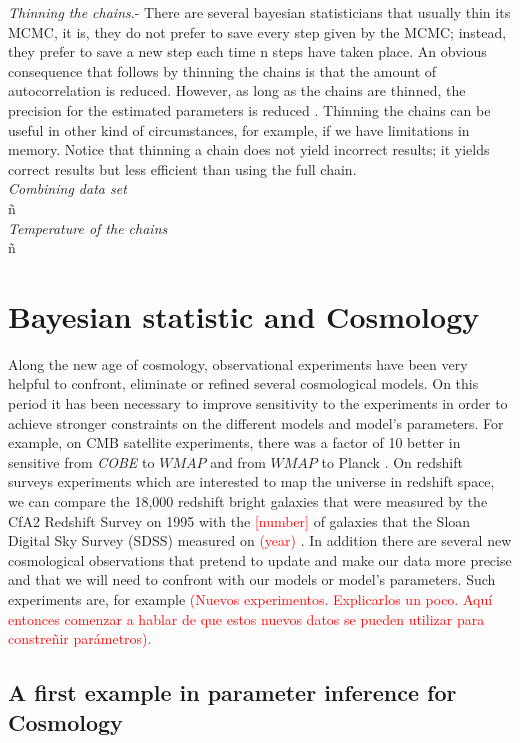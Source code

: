 \documentclass[onecolumn,           %
               showpacs,            %
               preprintnumbers,     %
               aps,                 %
               prl,          	    %
               letterpaper,             %
               superscriptaddress,      %
               nofootinbib,         %
               tightenlines,        %
               floats,floatfix      %
               ,usenatbib,
               ]{revtex4-1}
\begin{document}
 \textit{Thinning the chains}.- There are several bayesian statisticians that usually thin its MCMC, it is, they do not prefer to save every step given by the MCMC; instead, they prefer to save a new step each time n steps have taken place. An obvious consequence that follows by thinning the chains is that the amount of autocorrelation is reduced. However, as long as the chains are thinned, the precision for the estimated parameters is reduced \cite{thin}. Thinning the chains can be useful in other kind of circumstances, for example, if we have limitations in memory. Notice that thinning a chain does not yield incorrect results; it yields correct results but less efficient than using the full chain.       
\\

\textit{Combining data set}
\\ ñ\\
\textit{Temperature of the chains}
\\ ñ\\

\section{Bayesian statistic and Cosmology}

Along the new age of cosmology, observational experiments have been very helpful to confront, eliminate or refined several cosmological models. On this period it has been necessary to improve sensitivity to the experiments in order to achieve stronger constraints on the different models and model's parameters. For example, on CMB satellite experiments, there was a factor of 10 better in sensitive from \textit{COBE} to $WMAP$ and from $WMAP$ to Planck \cite{cmbex}.  On redshift surveys experiments which are interested to map the universe in redshift space, we can compare the 18,000 redshift bright galaxies that were measured by the CfA2 Redshift Survey on 1995 with the \textcolor{red}{[number]} of galaxies that the Sloan Digital Sky Survey (SDSS) measured on \textcolor{red}{(year)} \cite{observ}. In addition there are several new cosmological observations that pretend to update and make our data more precise and that we will need to confront with our models or model's parameters. Such experiments are, for example \textcolor{red}{(Nuevos experimentos. Explicarlos un poco. Aqu\'i entonces comenzar a hablar de que estos nuevos datos se pueden utilizar para constre\~nir par\'ametros).}

\subsection{A first example in parameter inference for Cosmology}
\end{document}
